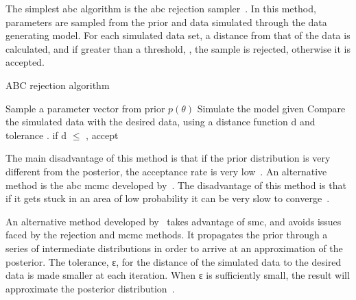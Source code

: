 The simplest \acrshort{abc} algorithm is the \acrshort{abc} rejection sampler~\autocite{Pritchard:1999td}. In this method, parameters are sampled from the prior and data simulated through the data generating model. For each simulated data set, a distance from that of the data is calculated, and if greater than a threshold, \textepsilon{}, the sample is rejected, otherwise it is accepted. 
\begin{algorithm}[H]

  \caption{ABC rejection algorithm}
 	\label{alg:ABC}
 \begin{algorithmic}[1]
    \Statex
	\State Sample a parameter vector \texttheta{} from prior $p(\theta)$
	\State Simulate the model given \texttheta{}
    \State Compare the simulated data with the desired data, using a distance function d and tolerance \textepsilon{}. if d $\leq$ \textepsilon{}, accept \texttheta{} 
   
  \end{algorithmic}
\end{algorithm}


\noindent The main disadvantage of this method is that if the prior distribution is very different from the posterior, the acceptance rate is very low~\autocite{Toni:2009tr}. An alternative method is the \acrshort{abc} \acrfull{mcmc} developed by~\textcite{Marjoram:2003up}. The disadvantage of this method is that if it gets stuck in an area of low probability it can be very slow to converge~\autocite{Sisson:2007il}. 

An alternative method developed by~\textcite{Toni:2009tr} takes advantage of \acrlong{smc}, and avoids issues faced by the rejection and \acrshort{mcmc} methods. It propagates the prior through a series of intermediate distributions in order to arrive at an approximation of the posterior. The tolerance, ε, for the distance of the simulated data to the desired data is made smaller at each iteration. When ε is sufficiently small, the result will approximate the posterior distribution~\autocite{Toni:2009tr}.  


